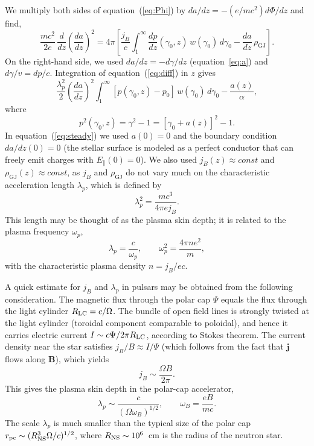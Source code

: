 We multiply both sides of equation~(\ref{eq:Phi}) by $da/dz=-(e/mc^2)d\Phi/dz$ and find,
\begin{equation}
\label{eq:diff}
     \frac{mc^2}{2e}\,\frac{d}{dz}\left(\frac{da}{dz}\right)^2
   =4\pi\left[
   \frac{j_B}{c}\int_1^{\infty} \frac{dp}{dz}(\gamma_0,z)\,w(\gamma_0)\,d\gamma_0
         -\frac{da}{dz}\,\rho_\mathrm{GJ}\right].
\end{equation}
On the right-hand side, we used $da/dz=-d\gamma/dz$ (equation~\ref{eq:a}) and
$d\gamma/v=dp/c$. Integration of equation~(\ref{eq:diff}) in $z$ gives
\begin{equation}
\label{eq:steady}
    \frac{\lambda_p^2}{2}\left(\frac{da}{dz}\right)^2
         \int_1^{\infty} \left[p(\gamma_0,z)-p_0\right]\,w(\gamma_0)\,d\gamma_0
           -\frac{a(z)}{\alpha},
\end{equation}
where
\begin{equation}
   p^2(\gamma_0,z)=\gamma^2-1=\left[\gamma_0+a(z)\right]^2-1.
\end{equation}
In equation~(\ref{eq:steady}) we used $a(0)=0$ and the boundary condition $da/dz(0)=0$
(the stellar surface is modeled as a perfect conductor that can freely emit charges
with $E_\parallel(0)=0$). We also used $j_B(z)\approx const$ and
$\rho_\mathrm{GJ}(z)\approx const$, as $j_B$ and $\rho_\mathrm{GJ}$ do not vary much on the
characteristic acceleration length $\lambda_p$, which is defined by
\begin{equation}
\label{eq:lambda}
   \lambda_p^2=\frac{mc^3}{4\pi e j_B}.
\end{equation}
This length may be thought of as the plasma skin depth; it is related to the
plasma frequency $\omega_p$,
\begin{equation}
   \lambda_p=\frac{c}{\omega_p}, \qquad \omega_p^2=\frac{4\pi n e^2}{m},
\end{equation}
with the characteristic plasma density $n=j_B/ec$.

A quick estimate for $j_B$ and $\lambda_p$ in pulsars may be obtained from
the following consideration. The magnetic flux through the polar cap $\Psi$ equals
the flux through the light cylinder $R_{\rm LC}=c/\Omega$.
The bundle of open field lines is strongly twisted at the light cylinder
(toroidal component comparable to poloidal), and hence it carries
electric current $I\sim c\Psi/2\pi R_{\rm LC}$, according to Stokes theorem.
The current density near the star satisfies $j_B/B\approx I/\Psi$
(which follows from the fact that $\mathbf{j}$ flows along $\mathbf{B}$), which yields
\begin{equation}
\label{eq:j_B}
     j_B\sim \frac{\Omega B}{2\pi}.
\end{equation}
This gives the plasma skin depth in the polar-cap accelerator,
\begin{equation}
    \lambda_p \sim \frac{c}{(\Omega\omega_B)^{1/2}},
    \qquad \omega_B=\frac{eB}{mc}.
\end{equation}
The scale $\lambda_p$ is much smaller than the typical size of the polar cap
$r_{\rm pc}\sim(R_{\rm NS}^3\Omega/c)^{1/2}$, where $R_{\rm NS}\sim 10^6$~cm is the radius of
the neutron star.

